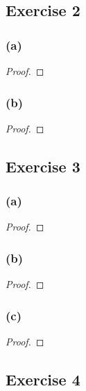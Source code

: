 \documentclass[14pt]{extarticle}
\begin{document}
\subsection{Exercise 2}

\subsubsection{(a)}

\begin{proof}

\end{proof}

\subsubsection{(b)}

\begin{proof}

\end{proof}

\subsection{Exercise 3}

\subsubsection{(a)}

\begin{proof}

\end{proof}

\subsubsection{(b)}

\begin{proof}

\end{proof}

\subsubsection{(c)}

\begin{proof}

\end{proof}

\subsection{Exercise 4}
\end{document}
